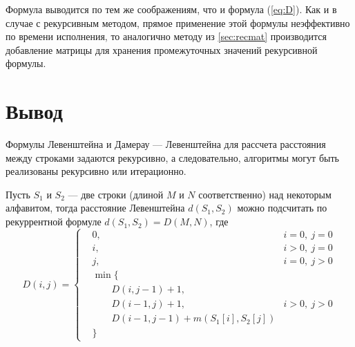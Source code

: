 Формула выводится по тем же соображениям, что и формула (\ref{eq:D}).
Как и в случае с рекурсивным методом, прямое применение этой формулы неэффективно по времени исполнения, то аналогично методу из \ref{sec:recmat} производится добавление матрицы для хранения промежуточных значений рекурсивной формулы.

\section*{Вывод}

Формулы Левенштейна и Дамерау — Левенштейна для рассчета расстояния между строками задаются рекурсивно, а следовательно, алгоритмы могут быть реализованы рекурсивно или итерационно.

Пусть $S_{1}$ и $S_{2}$ — две строки (длиной $M$ и $N$ соответственно) над некоторым алфавитом, тогда расстояние Левенштейна $d(S_{1},S_{2})$ можно подсчитать по рекуррентной формуле $d(S_{1},S_{2}) = D(M,N)$, где\\
\begin{equation}
	D(i,j) = 
	\left \{ \begin{aligned}
		& 0, & i = 0, \medspace j = 0\\
		& i, & i > 0, \medspace j = 0\\
		& j, & i = 0, \medspace j > 0\\
		& \min\{ &\\
		& \qquad D(i, j - 1) + 1, & \\
		& \qquad D(i - 1, j) + 1, & i > 0, \medspace j > 0\\
		& \qquad D(i - 1, j - 1) + m(S_{1}[i], S_{2}[j]) &\\
		& \} &
	\end{aligned} \right. 
\end{equation}
